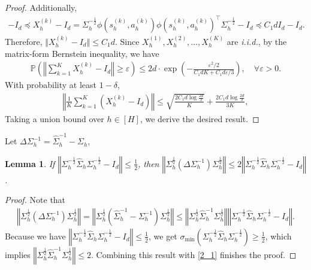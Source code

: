 \documentclass{article}
\newtheorem{lemma}{Lemma}[section]
\numberwithin{equation}{section}
\begin{document}
\begin{proof}
Additionally,
\begin{align*}
	-I_d\preceq X_h^{(k)}-I_d=\Sigma_h^{-\frac{1}{2}}\phi\left(s^{(k)}_h,a^{(k)}_h\right)\phi\left(s^{(k)}_h,a^{(k)}_h\right)^\top\Sigma_h^{-\frac{1}{2}}-I_d \preceq C_1dI_d-I_d. 
\end{align*}
Therefore, $\Vert X_h^{(k)}-I_d\Vert\leq C_1d$. Since $X^{(1)}_h,X^{(2)}_h,\ldots,X^{(K)}_h$ are \textit{i.i.d.}, by the matrix-form Bernstein inequality, we have
\begin{align*}
	\mathbb{P}\left(\left\Vert\sum_{k=1}^K X_h^{(k)}-I_d\right\Vert\geq\varepsilon\right)\leq 2d\cdot\exp\left(-\frac{\varepsilon^2/2}{C_1dK+C_1d \varepsilon/3}\right),\quad \forall \varepsilon>0. 
\end{align*}
With probability at least $1 - \delta$,
\begin{align*}
    \left\Vert\frac{1}{K}\sum_{k=1}^K\left(X_h^{(k)}-I_d\right)\right\Vert\leq \sqrt{\frac{2C_1d\log\frac{2d}{\delta}}{K}}+\frac{2C_1d\log\frac{2d}{\delta}}{3K}, 
\end{align*}
Taking a union bound over $h\in[H]$, we derive the desired result.	
\end{proof}
Let $\Delta\Sigma_h^{-1}=\widehat{\Sigma}_h^{-1}-\Sigma_h$, 
\begin{lemma}
\label{dsig2}
If $\left\Vert\Sigma_h^{-\frac{1}{2}}\widehat{\Sigma}_h\Sigma_h^{-\frac{1}{2}}-I_d\right\Vert\leq\frac{1}{2}$, then 
$\left\Vert\Sigma_h^{\frac{1}{2}}\left(\Delta\Sigma_h^{-1}\right)\Sigma_h^{\frac{1}{2}}\right\Vert\leq 2\left\Vert\Sigma_h^{-\frac{1}{2}}\widehat{\Sigma}_h\Sigma_h^{-\frac{1}{2}}-I_d\right\Vert$. 
\end{lemma}
\begin{proof}
Note that
\begin{align}
    \label{2_1}
    \left\Vert\Sigma_h^{\frac{1}{2}}\left(\Delta\Sigma_h^{-1}\right)\Sigma_h^{\frac{1}{2}}\right\Vert=\left\Vert\Sigma_h^{\frac{1}{2}}\left(\widehat{\Sigma}_h^{-1}-\Sigma_h^{-1}\right)\Sigma_h^{\frac{1}{2}}\right\Vert\leq\left\Vert\Sigma_h^{\frac{1}{2}}\widehat{\Sigma}_h^{-1}\Sigma_h^{\frac{1}{2}}\right\Vert\left\Vert\Sigma_h^{-\frac{1}{2}}\widehat{\Sigma}_h\Sigma_h^{-\frac{1}{2}}-I_d\right\Vert.  
\end{align}
Because we have $\left\Vert\Sigma_h^{-\frac{1}{2}}\widehat{\Sigma}_h\Sigma_h^{-\frac{1}{2}}-I_d\right\Vert\leq\frac{1}{2}$, we get $\sigma_{\textrm{min}}\left(\Sigma_h^{-\frac{1}{2}}\widehat{\Sigma}_h\Sigma_h^{-\frac{1}{2}}\right)\geq\frac{1}{2}$, which implies $\left\Vert\Sigma_h^{\frac{1}{2}}\widehat{\Sigma}_h^{-1}\Sigma_h^{\frac{1}{2}}\right\Vert\leq 2$. Combining this result with \eqref{2_1} finishes the proof. 
\end{proof}
\end{document}
